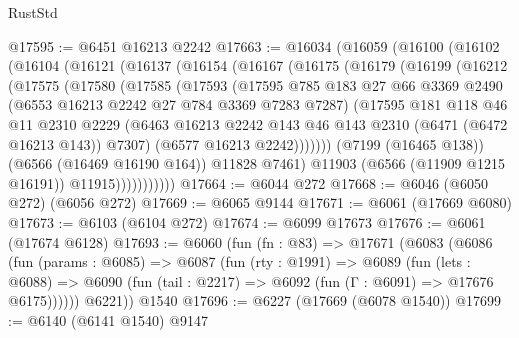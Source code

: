 \begin{lexlean}{RustStd}
\begin{coremodule}
{\begin{coremodule}
{{{{{{{{{{{{{{{{{{{{{{{{{{@17595 := @6451 @16213 @2242
@17663 := @16034
    (@16059
      (@16100
        (@16102
          (@16104
            (@16121
              (@16137
                (@16154
                  (@16167
                    (@16175
                      (@16179
                        (@16199
                          (@16212
                            (@17575
                              (@17580
                                (@17585
                                  (@17593
                                    (@17595
                                      @785
                                      @183
                                      @27
                                      @66
                                      @3369
                                      @2490
                                      (@6553 @16213 @2242 @27 @784 @3369 @7283 @7287)
                                      (@17595
                                        @181
                                        @118
                                        @46
                                        @11
                                        @2310
                                        @2229
                                        (@6463
                                          @16213
                                          @2242
                                          @143
                                          @46
                                          @143
                                          @2310
                                          (@6471 (@6472 @16213 @143))
                                          @7307)
                                        (@6577 @16213 @2242)))))))
                            (@7199 (@16465 @138))
                            (@6566 (@16469 @16190 @164))
                            @11828
                            @7461)
                          @11903
                          (@6566 (@11909 @1215 @16191))
                          @11915)))))))))))
@17664 := @6044 @272
@17668 := @6046 (@6050 @272) (@6056 @272)
@17669 := @6065 @9144
@17671 := @6061 (@17669 @6080)
@17673 := @6103 (@6104 @272)
@17674 := @6099 @17673
@17676 := @6061 (@17674 @6128)
@17693 := @6060
    (fun (fn : @83) =>
    @17671
      (@6083
        (@6086
          (fun (params : @6085) =>
          @6087
            (fun (rty : @1991) =>
            @6089
              (fun (lets : @6088) =>
              @6090 (fun (tail : @2217) => @6092 (fun (Γ : @6091) => @17676 @6175))))))
        @6221))
    @1540
@17696 := @6227 (@17669 (@6078 @1540))
@17699 := @6140 (@6141 @1540) @9147
}}}}}}}}}}}}}}}}}}}}}}}}}}
\end{coremodule}}
\end{coremodule}
\end{lexlean}
